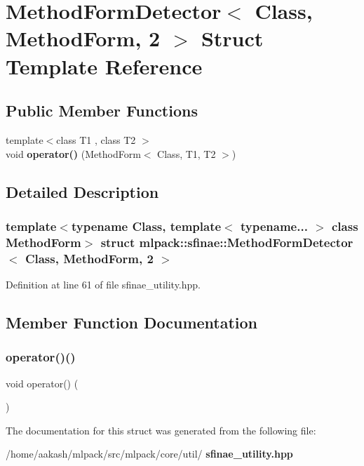 \section{Method\+Form\+Detector$<$ Class, Method\+Form, 2 $>$ Struct Template Reference}
\label{structmlpack_1_1sfinae_1_1MethodFormDetector_3_01Class_00_01MethodForm_00_012_01_4}
\subsection*{Public Member Functions}
\begin{DoxyCompactItemize}
\item 
{\footnotesize template$<$class T1 , class T2 $>$ }\\void \textbf{ operator()} (Method\+Form$<$ Class, T1, T2 $>$)
\end{DoxyCompactItemize}


\subsection{Detailed Description}
\subsubsection*{template$<$typename Class, template$<$ typename... $>$ class Method\+Form$>$\newline
struct mlpack\+::sfinae\+::\+Method\+Form\+Detector$<$ Class, Method\+Form, 2 $>$}



Definition at line 61 of file sfinae\+\_\+utility.\+hpp.



\subsection{Member Function Documentation}
\mbox{\label{structmlpack_1_1sfinae_1_1MethodFormDetector_3_01Class_00_01MethodForm_00_012_01_4_ae52cf635d15bd6998e003d5729ac3d08}} 
\subsubsection{operator()()}
{\footnotesize\ttfamily void operator() (\begin{DoxyParamCaption}\item[{Method\+Form$<$ Class, T1, T2 $>$}]{ }\end{DoxyParamCaption})}



The documentation for this struct was generated from the following file\+:\begin{DoxyCompactItemize}
\item 
/home/aakash/mlpack/src/mlpack/core/util/\textbf{ sfinae\+\_\+utility.\+hpp}\end{DoxyCompactItemize}
